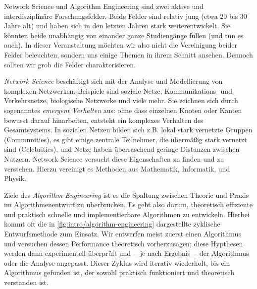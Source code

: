 \glqq Network Science\grqq{} und \glqq Algorithm Engineering\grqq{} sind zwei aktive und interdisziplinäre Forschungsfelder.
Beide Felder sind relativ jung (etwa 20 bis 30 Jahre alt) und haben sich in den letzten Jahren stark weiterentwickelt.
Sie könnten beide unabhängig von einander ganze Studiengänge füllen (und tun es auch).
In dieser Veranstaltung möchten wir also nicht die Vereinigung beider Felder beleuchten, sondern uns einige Themen in ihrem Schnitt ansehen.
Dennoch sollten wir grob die Felder charakterisieren.

\emph{Network Science} beschäftigt sich mit der Analyse und Modellierung von komplexen Netzwerken.
Beispiele sind soziale Netze, Kommunikations- und Verkehrsnetze, biologische Netzwerke und viele mehr.
Sie zeichnen sich durch sogenanntes \emph{emergent Verhalten} aus: ohne dass einzelnen Knoten oder Kanten bewusst darauf hinarbeiten, entsteht ein komplexes Verhalten des Gesamtsystems.
In sozialen Netzen bilden sich z.B. lokal stark vernetzte Gruppen (Communities), es gibt einige zentrale Teilnehmer, die übermäßig stark vernetzt sind (Celebrities), und Netze haben überraschend geringe Distanzen zwischen Nutzern.
Network Science versucht diese Eigenschaften zu finden und zu verstehen.
Hierzu vereinigt es Methoden aus Mathematik, Informatik, und Physik.

\vspace{-2em}
Ziele des \emph{Algorithm Engineering} ist es die Spaltung zwischen Theorie und Praxis im Algorithmenentwurf zu überbrücken.
Es geht also darum, theoretisch effiziente und praktisch schnelle und implementierbare Algorithmen zu entwickeln.
Hierbei kommt oft die in \cref{fig:intro/algorithm-engineering} dargestellte zyklische Entwurfsmethode zum Einsatz.
Wir entwerfen meist zuerst einen Algorithmus und versuchen dessen Performance theoretisch vorherzusagen;
diese Hypthesen werden dann experimentell überprüft und ---je nach Ergebnis--- der Algorithmus oder die Analyse angepasst.
Dieser Zyklus wird iterativ wiederholt, bis ein Algorithmus gefunden ist, der sowohl praktisch funktioniert und theoretisch verstanden ist.

